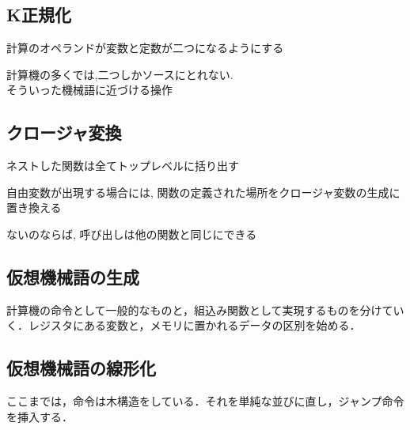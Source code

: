 \documentclass[papersize,30pt,slide]{jsarticle}
\begin{document}
\newpage
\subsection{K正規化}
計算のオペランドが変数と定数が二つになるようにする

計算機の多くでは,二つしかソースにとれない. \\
そういった機械語に近づける操作

\subsection{クロージャ変換}
ネストした関数は全てトップレベルに括り出す

自由変数が出現する場合には, 関数の定義された場所をクロージャ変数の生成に置き換える

ないのならば, 呼び出しは他の関数と同じにできる

\newpage

\subsection{仮想機械語の生成}
計算機の命令として一般的なものと，組込み関数として実現するものを分けてい
く．レジスタにある変数と，メモリに置かれるデータの区別を始める．

\subsection{仮想機械語の線形化}
ここまでは，命令は木構造をしている．それを単純な並びに直し，ジャンプ命令
を挿入する．
\end{document}
